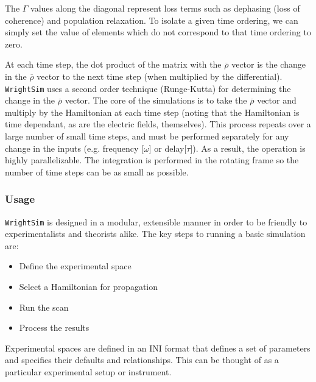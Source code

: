 The \(\Gamma\) values along the diagonal represent loss terms such as
dephasing (loss of coherence) and population relaxation. To isolate a
given time ordering, we can simply set the value of elements which do
not correspond to that time ordering to zero.

At each time step, the dot product of the matrix with the
\(\overline{\rho}\) vector is the change in the \(\overline{\rho}\)
vector to the next time step (when multiplied by the differential).
\texttt{WrightSim} uses a second order technique (Runge-Kutta)
\cite{Blanchard2006} for determining the change in the
\(\overline{\rho}\) vector. The core of the simulations is to take the
\(\overline{\rho}\) vector and multiply by the Hamiltonian at each time
step (noting that the Hamiltonian is time dependant, as are the electric
fields, themselves). This process repeats over a large number of small
time steps, and must be performed separately for any change in the
inputs (e.g. frequency {[}\(\omega\){]} or delay{[}\(\tau\){]}). As a
result, the operation is highly parallelizable. The integration is
performed in the rotating frame so the number of time steps can be as
small as possible.

\hypertarget{usage}{%
\subsubsection{Usage}\label{usage}}

\texttt{WrightSim} is designed in a modular, extensible manner in order
to be friendly to experimentalists and theorists alike. The key steps to
running a basic simulation are:

\begin{itemize}
\tightlist
\item
  Define the experimental space
\item
  Select a Hamiltonian for propagation
\item
  Run the scan
\item
  Process the results
\end{itemize}

Experimental spaces are defined in an INI format that defines a set of
parameters and specifies their defaults and relationships. This can be
thought of as a particular experimental setup or instrument.

